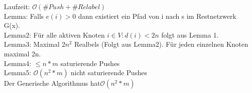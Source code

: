 \documentclass[a4paper]{article}
\newcommand{\oh}[1]{$\mathcal{O}(#1)$}
\begin{document}
Laufzeit: \oh{\#Push+\#Relabel}\\
Lemma: Falls $e(i)>0$ dann existiert ein Pfad von i nach s im Restnetzwerk G(x).\\
Lemma2: Für alle aktiven Knoten $i\in V: d(i)<2n$ folgt aus Lemma 1.\\
Lemma3: Maximal $2n^2$ Realbels (Folgt aus Lemma2). Für jeden einzelnen Knoten maximal 2n.\\
Lemma4: $\leq n*m$ saturierende Pushes\\
Lemma5: \oh{n^2*m} nicht saturierende Pushes\\
Der Generische Algorithmus hat\oh{n^2*m}
\end{document}

